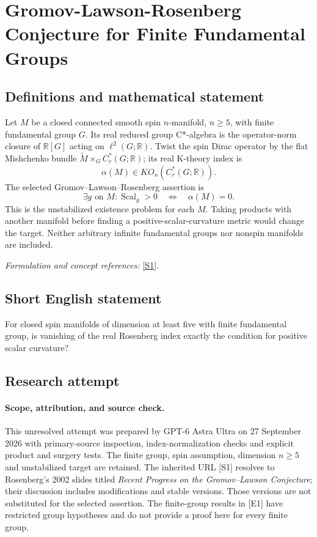 \documentclass[11pt]{article}
\begin{document}
\section*{\texorpdfstring{Gromov-Lawson-Rosenberg Conjecture for Finite Fundamental Groups}{Gromov-Lawson-Rosenberg Conjecture for Finite Fundamental Groups}}\label{statement}
\subsection{Definitions and mathematical statement}
Let $M$ be a closed connected smooth spin $n$-manifold, $n\ge5$, with finite fundamental group $G$. Its real reduced group C*-algebra is the operator-norm closure of ${\mathbb{R}}[G]$ acting on $\ell^2(G;{\mathbb{R}})$. Twist the spin Dirac operator by the flat Mishchenko bundle $\widetilde M\times_G C_r^*(G;{\mathbb{R}})$; its real K-theory index is
\[
 \alpha(M)\in KO_n(C_r^*(G;{\mathbb{R}})).
\]
The selected Gromov--Lawson--Rosenberg assertion is
\[
 \exists g\text{ on }M:\operatorname{Scal}_g>0
 \quad\Longleftrightarrow\quad\alpha(M)=0.
\]
This is the unstabilized existence problem for each $M$. Taking products with another manifold before finding a positive-scalar-curvature metric would change the target. Neither arbitrary infinite fundamental groups nor nonspin manifolds are included.
\par\smallskip\textit{Formulation and concept references:} \href{https://www.math.umd.edu/~jmr/LawsonConf.pdf}{[S1]}.

\subsection{Short English statement}
For closed spin manifolds of dimension at least five with finite fundamental group, is vanishing of the real Rosenberg index exactly the condition for positive scalar curvature?
\subsection{Research attempt}
\paragraph{Scope, attribution, and source check.}
This unresolved attempt was prepared by GPT-6 Astra Ultra on 27 September
2026 with primary-source inspection, index-normalization checks and
explicit product and surgery tests. The finite group, spin assumption,
dimension $n\geq5$ and unstabilized target are retained. The inherited
URL [S1] resolves to Rosenberg's 2002 slides titled \emph{Recent Progress
on the Gromov--Lawson Conjecture}; their discussion includes modifications
and stable versions. Those versions are not substituted for the selected
assertion. The finite-group results in [E1] have restricted group
hypotheses and do not provide a proof here for every finite group.
\end{document}
